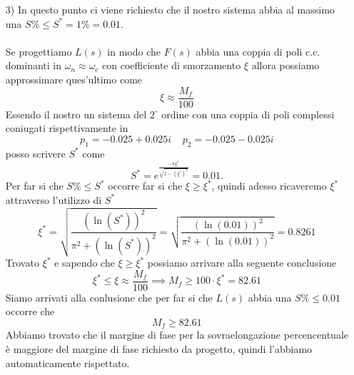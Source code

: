 \documentclass[a4paper, 11pt]{article}
\begin{document}
\begin{itemize}
    \item[3)] In questo punto ci viene richiesto che il nostro sistema abbia al massimo una $S \% \le S^* = 1 \% = 0.01$.
    \\
    \\
    Se progettiamo $L(s)$ in modo che $F(s)$ abbia una coppia di poli c.c. dominanti in $\omega_n \approx \omega_c$ con coefficiente di smorzamento $\xi$ allora possiamo approssimare ques'ultimo come
    \begin{equation*}
        \xi \approx \frac{M_f}{100}
    \end{equation*}
    Essendo il nostro un sistema del $2^{\circ}$ ordine con una coppia di poli complessi coniugati rispettivamente in 
    \begin{equation*}
        p_1 = -0.025 + 0.025i \ \ \ \ \
        p_2 = -0.025 - 0.025i
    \end{equation*}
    posso scrivere $S^*$ come 
    \begin{equation*}
        S^* = e^{\frac{- \pi \xi^*}{\sqrt{1 - (\xi^*)^2}}} = 0.01.
    \end{equation*}
    Per far si che $S \% \le S^*$ occorre far si che $\xi \ge \xi^*$, quindi adesso ricaveremo $\xi^*$ attraverso l'utilizzo di $S^*$
    \begin{equation*}
        \xi^* = \sqrt{\frac{(\ln(S^*))^2}{\pi^2 + (\ln(S^*))^2}} = 
        \sqrt{\frac{(\ln(0.01))^2}{\pi^2 + (\ln(0.01))^2}} = 0.8261
    \end{equation*}
    Trovato $\xi^*$ e sapendo che $\xi \ge \xi^*$ possiamo arrivare alla seguente conclusione 
    \begin{equation*}
        \xi^* \le \xi \approx \frac{M_f}{100} \implies M_f \ge 100 \cdot \xi^* = 82.61
    \end{equation*}
    Siamo arrivati alla conlusione che per far si che $L(s)$ abbia una $S \% \le 0.01$ occorre che
    \begin{equation*}
        M_f \ge 82.61
    \end{equation*}
    Abbiamo trovato che il margine di fase per la sovraelongazione percencentuale è maggiore del margine di fase richiesto da progetto, quindi l'abbiamo automaticamente rispettato.


\end{itemize}
\end{document}
